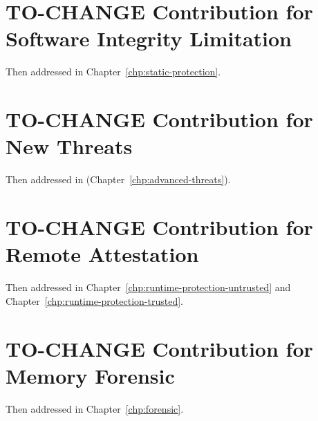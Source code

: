 \section{TO-CHANGE Contribution for Software Integrity Limitation}
\label{sec:contribution1}

Then addressed in Chapter~\ref{chp:static-protection}.

\section{TO-CHANGE Contribution for New Threats}
\label{sec:contribution2}

Then addressed in (Chapter~\ref{chp:advanced-threats}).

\section{TO-CHANGE Contribution for Remote Attestation}
\label{sec:contribution3}

Then addressed in Chapter~\ref{chp:runtime-protection-untrusted} and
Chapter~\ref{chp:runtime-protection-trusted}.

\section{TO-CHANGE Contribution for Memory Forensic}
\label{sec:contribution4}

Then addressed in Chapter~\ref{chp:forensic}.


